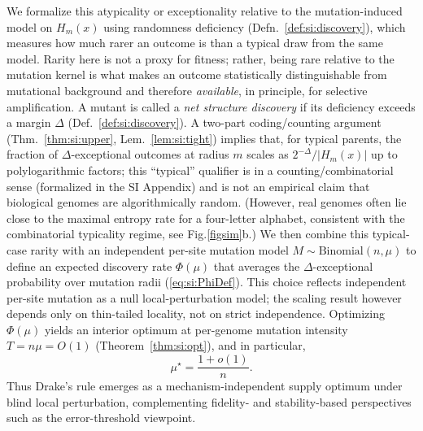 \documentclass[9pt,twocolumn,oneside]{pnas-new}
\begin{document}
We formalize this atypicality or exceptionality relative to the mutation-induced model on $H_m(x)$ using randomness deficiency (Defn.~\ref{def:si:discovery}), which measures how much rarer an outcome is than a typical draw from the same model. Rarity here is not a proxy for fitness; rather, being rare relative to the mutation kernel is what makes an outcome statistically distinguishable from mutational background and therefore \emph{available}, in principle, for selective amplification. A mutant is called a \emph{net structure discovery} if its deficiency exceeds a margin $\Delta$ (Def.~\ref{def:si:discovery}). A two-part coding/counting argument (Thm.~\ref{thm:si:upper}, Lem.~\ref{lem:si:tight}) implies that, for typical parents, the fraction of $\Delta$-exceptional outcomes at radius $m$ scales as $2^{-\Delta}/|H_m(x)|$ up to polylogarithmic factors; this ``typical'' qualifier is in a counting/combinatorial sense (formalized in the SI Appendix) and is not an empirical claim that biological genomes are algorithmically random. (However, real genomes often lie close to the maximal entropy rate for a four-letter alphabet, consistent with the combinatorial typicality regime, see Fig.\ref{figsim}b.) We then combine this typical-case rarity with an independent per-site mutation model $M\sim\mathrm{Binomial}(n,\mu)$ to define an expected discovery rate $\Phi(\mu)$ that averages the $\Delta$-exceptional probability over mutation radii (\eqref{eq:si:PhiDef}). This choice reflects independent per-site mutation as a null local-perturbation model; the scaling result however depends only on thin-tailed locality, not on strict independence. Optimizing $\Phi(\mu)$ yields an interior optimum at per-genome mutation intensity $T=n\mu=O(1)$ (Theorem~\ref{thm:si:opt}), and in particular,
\[
\mu^\star=\frac{1+o(1)}{n}.
\]
Thus Drake’s rule emerges as a mechanism-independent supply optimum under blind local perturbation, complementing fidelity- and stability-based perspectives such as the error-threshold viewpoint.
\end{document}
